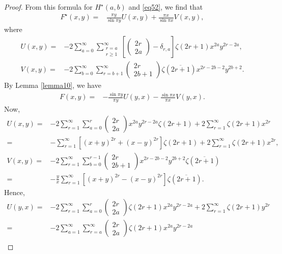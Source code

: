 \documentclass[reqno]{amsart}
\theoremstyle{definition}
\theoremstyle{remark}
\numberwithin{equation}{section}
\begin{document}
\begin{proof}
From this formula for $H^{\star}(a, b)$ and \eqref{eq52}, we find that
\begin{align*}
F^{\star}(x,y)=&\frac{\pi y}{\sin \pi y}U(x,y)+\frac{\pi x}{\sin \pi x}V(x,y),
\end{align*}
where
\begin{align*}
U(x,y)=&-2\sum_{a=0}^{\infty}\sum_{\substack{r=a\\r\geq 1}}^{\infty} \left[\begin{pmatrix} 2r\\2a\end{pmatrix}-\delta_{r,a} \right] \zeta(2r+1)x^{2a}y^{2r-2a},\\
V(x,y)=&-2\sum_{b=0}^{\infty} \sum_{r=b+1}^{\infty}\begin{pmatrix} 2r\\2b+1\end{pmatrix}\zeta\left(\overline{2r+1}\right)x^{2r-2b-2}y^{2b+2}.
\end{align*}
By Lemma \ref{lemma10}, we have
\begin{align}\label{eq60}
F(x,y)=&-\frac{\sin\pi y}{\pi y}U(y,x)-\frac{\sin\pi x}{\pi x} V(y,x).
\end{align}
Now,
\begin{align*}
U(x,y)=&-2\sum_{r=1}^{\infty}\sum_{a=0}^r  \begin{pmatrix} 2r\\2a\end{pmatrix}x^{2a}y^{2r-2a} \zeta(2r+1)+2\sum_{r=1}^{\infty}\zeta(2r+1)x^{2r}\\
=&-\sum_{r=1}^{\infty}\left[(x+y)^{2r}+(x-y)^{2r}\right]\zeta(2r+1)+2\sum_{r=1}^{\infty}\zeta(2r+1)x^{2r},
\\
V(x,y)=&-2\sum_{r=1}^{\infty} \sum_{b=0}^{r-1}\begin{pmatrix} 2r\\2b+1\end{pmatrix}x^{2r-2b-2}y^{2b+2}\zeta\left(\overline{2r+1}\right)\\
=&-\frac{y}{x}\sum_{r=1}^{\infty}\left[(x+y)^{2r}-(x-y)^{2r}\right]\zeta\left(\overline{2r+1}\right).
\end{align*}
Hence,
\begin{align*}
U(y,x)=&-2\sum_{r=1}^{\infty}\sum_{a=0}^r \begin{pmatrix} 2r\\2a\end{pmatrix} \zeta(2r+1)x^{2a}y^{2r-2a}+2\sum_{r=1}^{\infty}\zeta(2r+1)y^{2r}\\
=&-2\sum_{a=1}^{\infty}\sum_{r=a}^{\infty} \begin{pmatrix} 2r\\2a\end{pmatrix} \zeta(2r+1)x^{2a}y^{2r-2a}\\

\end{align*}
\end{proof}
\end{document}
